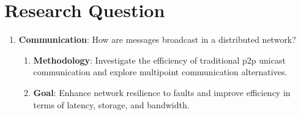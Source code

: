 \section{Research Question}
\begin{frame}
    \begin{enumerate}
        \item \textbf{Communication}: How are messages broadcast in a distributed network?
        \begin{enumerate}
            \item \textbf{Methodology}: Investigate the efficiency of traditional p2p unicast communication and explore multipoint communication alternatives.
            \item \textbf{Goal}: Enhance network resilience to faults and improve efficiency in terms of latency, storage, and bandwidth.
        \end{enumerate}
    \end{enumerate}
\end{frame}